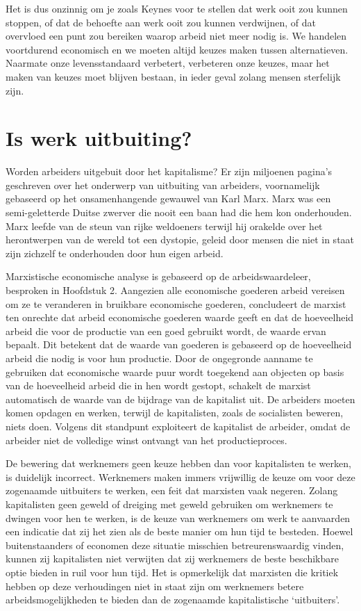 Het is dus onzinnig om je zoals Keynes voor te stellen dat werk
ooit zou kunnen stoppen, of dat de behoefte aan werk ooit zou kunnen
verdwijnen, of dat overvloed een punt zou bereiken waarop arbeid niet
meer nodig is. We handelen voortdurend economisch en we moeten altijd
keuzes maken tussen alternatieven. Naarmate onze levensstandaard
verbetert, verbeteren onze keuzes, maar het maken van keuzes moet
blijven bestaan, in ieder geval zolang mensen sterfelijk zijn.

\section{Is werk uitbuiting?}

Worden arbeiders uitgebuit door het kapitalisme? Er zijn miljoenen
pagina's geschreven over het onderwerp van uitbuiting
van arbeiders, voornamelijk gebaseerd op het onsamenhangende gewauwel
van Karl Marx. Marx was een semi-geletterde Duitse zwerver die nooit een
baan had die hem kon onderhouden. Marx leefde van de steun van rijke weldoeners 
terwijl hij orakelde over het herontwerpen van de wereld tot een dystopie, 
geleid door mensen die niet in staat zijn zichzelf te onderhouden door hun eigen arbeid.

Marxistische economische analyse is gebaseerd op de arbeidswaardeleer,
besproken in Hoofdstuk 2. Aangezien alle economische goederen arbeid
vereisen om ze te veranderen in bruikbare economische goederen,
concludeert de marxist ten onrechte dat arbeid economische goederen
waarde geeft en dat de hoeveelheid arbeid die voor de productie van een
goed gebruikt wordt, de waarde ervan bepaalt. Dit betekent dat de waarde
van goederen is gebaseerd op de hoeveelheid arbeid die nodig is voor hun
productie. Door de ongegronde aanname te gebruiken dat economische
waarde puur wordt toegekend aan objecten op basis van de hoeveelheid
arbeid die in hen wordt gestopt, schakelt de marxist automatisch de
waarde van de bijdrage van de kapitalist uit. De arbeiders moeten komen
opdagen en werken, terwijl de kapitalisten, zoals de socialisten
beweren, niets doen. Volgens dit standpunt exploiteert de kapitalist de
arbeider, omdat de arbeider niet de volledige winst ontvangt van het
productieproces.

De bewering dat werknemers geen keuze hebben dan voor kapitalisten te werken, is duidelijk incorrect. Werknemers maken immers vrijwillig de keuze om voor deze zogenaamde uitbuiters te werken, een feit dat marxisten vaak negeren. Zolang kapitalisten geen geweld of dreiging met geweld gebruiken om werknemers te dwingen voor hen te werken, is de keuze van werknemers om werk te aanvaarden een indicatie dat zij het zien als de beste manier om hun tijd te besteden. Hoewel buitenstaanders of economen deze situatie misschien betreurenswaardig vinden, kunnen zij kapitalisten niet verwijten dat zij werknemers de beste beschikbare optie bieden in ruil voor hun tijd. Het is opmerkelijk dat marxisten die kritiek hebben op deze verhoudingen niet in staat zijn om werknemers betere arbeidsmogelijkheden te bieden dan de zogenaamde kapitalistische `uitbuiters'.

